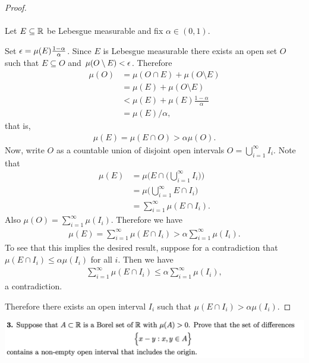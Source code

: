 \begin{proof}~\\~\\
  Let $E \subseteq \mathbb{R}$ be Lebesgue measurable and fix $\alpha \in (0, 1)$.

  Set $\epsilon = \mu(E)\frac{1 - \alpha}{\alpha}$. Since $E$ is Lebesgue measurable there exists an open set $O$
  such that $E \subseteq O$ and $\mu(O \setminus E) < \epsilon$. Therefore
  \begin{align*}
    \mu(O)
    &= \mu(O \cap E) + \mu(O \setminus E) \\
    &= \mu(E) + \mu(O \setminus E) \\
    &< \mu(E) + \mu(E)\frac{1 - \alpha}{\alpha} \\
    &= \mu(E)/\alpha,
  \end{align*}
  that is,
  \begin{align*}
    \mu(E) = \mu(E \cap O) > \alpha\mu(O).
  \end{align*}
  Now, write $O$ as a countable union of disjoint open intervals $O = \bigcup_{i=1}^\infty I_i$. Note that
    \begin{align*}
    \mu(E)
    &= \mu\Big(E \cap \big(\bigcup_{i=1}^\infty I_i\big)\Big) \\
    &= \mu\Big(\bigcup_{i=1}^\infty E \cap I_i\Big) \\
    &= \sum_{i=1}^\infty \mu(E \cap I_i).
  \end{align*}
  Also $\mu(O) = \sum_{i=1}^\infty \mu(I_i)$. Therefore we have
  \begin{align*}
    \mu(E) = \sum_{i=1}^\infty \mu(E \cap I_i) > \alpha \sum_{i=1}^\infty \mu(I_i).
  \end{align*}
  To see that this implies the desired result, suppose for a contradiction
  that $\mu(E \cap I_i) \leq \alpha \mu(I_i)$ for all $i$. Then we have
  \begin{align*}
    \sum_{i=1}^\infty \mu(E \cap I_i) \leq \alpha \sum_{i=1}^\infty \mu(I_i),
  \end{align*}
  a contradiction.

  Therefore there exists an open interval $I_i$ such that $\mu(E \cap I_i) > \alpha \mu(I_i)$.
\end{proof}


\newpage
\begin{mdframed}
\includegraphics[width=400pt]{img/analysis--berkeley-202a-hw05-ad8b.png}
\end{mdframed}


